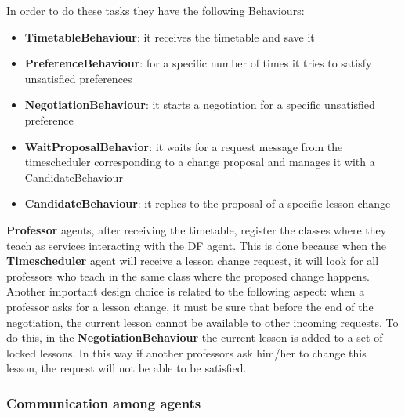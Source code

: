 In order to do these tasks they have the following Behaviours:
\begin{itemize}
    \item \textbf{TimetableBehaviour}: it receives the timetable and save it
    \item \textbf{PreferenceBehaviour}: for a specific number of times it tries to satisfy unsatisfied preferences
    \item \textbf{NegotiationBehaviour}: it starts a negotiation for a specific unsatisfied preference
    \item \textbf{WaitProposalBehavior}: it waits for a request message from the timescheduler corresponding to a change proposal and manages it with a CandidateBehaviour
    \item \textbf{CandidateBehaviour}: it replies to the proposal of a specific lesson change
\end{itemize}
\textbf{Professor} agents, after receiving the timetable, register the classes where they teach as services interacting with the DF agent. This is done because when the \textbf{Timescheduler} agent will receive a lesson change request, it will look for all professors who teach in the same class where the proposed change happens.\newline
Another important design choice is related to the following aspect: when a professor asks for a lesson change, it must be sure that before the end of the negotiation, the current lesson cannot be available to other incoming requests. To do this, in the \textbf{NegotiationBehaviour} the current lesson is added to a set of locked lessons. In this way if another professors ask him/her to change this lesson, the request will not be able to be satisfied.
\subsubsection{Communication among agents}


